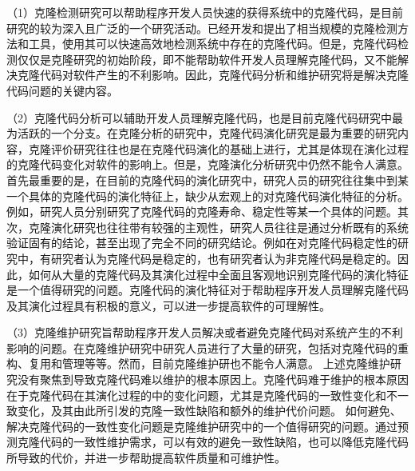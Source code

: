 （1）克隆检测研究可以帮助程序开发人员快速的获得系统中的克隆代码，是目前研究的较为深入且广泛的一个研究活动。已经开发和提出了相当规模的克隆检测方法和工具，使用其可以快速高效地检测系统中存在的克隆代码。但是，克隆代码检测仅仅是克隆研究的初始阶段，即不能帮助软件开发人员理解克隆代码，又不能解决克隆代码对软件产生的不利影响。因此，克隆代码分析和维护研究将是解决克隆代码问题的关键内容。

（2）克隆代码分析可以辅助开发人员理解克隆代码，也是目前克隆代码研究中最为活跃的一个分支。在克隆分析的研究中，克隆代码演化研究是最为重要的研究内容，克隆评价研究往往也是在克隆代码演化的基础上进行，尤其是体现在演化过程的克隆代码变化对软件的影响上。但是，克隆演化分析研究中仍然不能令人满意。首先最重要的是，在目前的克隆代码的演化研究中，研究人员的研究往往集中到某一个具体的克隆代码的演化特征上，缺少从宏观上的对克隆代码演化特征的分析。例如，研究人员分别研究了克隆代码的克隆寿命、稳定性等某一个具体的问题。其次，克隆演化研究也往往带有较强的主观性，研究人员往往是通过分析既有的系统验证固有的结论，甚至出现了完全不同的研究结论。例如在对克隆代码稳定性的研究中，有研究者认为克隆代码是稳定的，也有研究者认为非克隆代码是稳定的。因此，如何从大量的克隆代码及其演化过程中全面且客观地识别克隆代码的演化特征是一个值得研究的问题。克隆代码的演化特征对于帮助程序开发人员理解克隆代码及其演化过程具有积极的意义，可以进一步提高软件的可理解性。


（3）克隆维护研究旨帮助程序开发人员解决或者避免克隆代码对系统产生的不利影响的问题。在克隆维护研究中研究人员进行了大量的研究，包括对克隆代码的重构、复用和管理等等。然而，目前克隆维护研也不能令人满意。%
上述克隆维护研究没有聚焦到导致克隆代码难以维护的根本原因上。克隆代码难于维护的根本原因在于克隆代码在其演化过程的中的变化问题，尤其是克隆代码的一致性变化和不一致变化，及其由此所引发的克隆一致性缺陷和额外的维护代价问题。%
如何避免、解决克隆代码的一致性变化问题是克隆维护研究中的一个值得研究的问题。通过预测克隆代码的一致性维护需求，可以有效的避免一致性缺陷，也可以降低克隆代码所导致的代价，并进一步帮助提高软件质量和可维护性。


